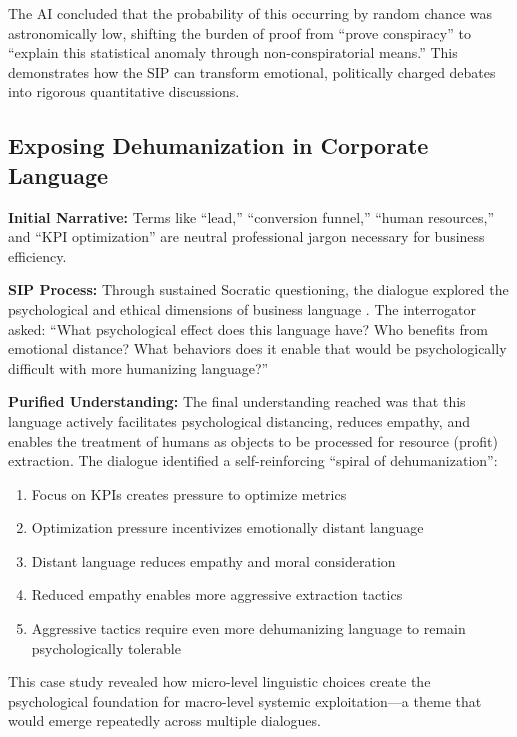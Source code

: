 \documentclass[11pt,a4paper]{article}
\begin{document}
The AI concluded that the probability of this occurring by random chance was astronomically low, shifting the burden of proof from ``prove conspiracy'' to ``explain this statistical anomaly through non-conspiratorial means.'' This demonstrates how the SIP can transform emotional, politically charged debates into rigorous quantitative discussions.

\subsection{Exposing Dehumanization in Corporate Language}

\textbf{Initial Narrative:} Terms like ``lead,'' ``conversion funnel,'' ``human resources,'' and ``KPI optimization'' are neutral professional jargon necessary for business efficiency.

\textbf{SIP Process:} Through sustained Socratic questioning, the dialogue explored the psychological and ethical dimensions of business language \citep{dialogue0}. The interrogator asked: ``What psychological effect does this language have? Who benefits from emotional distance? What behaviors does it enable that would be psychologically difficult with more humanizing language?''

\textbf{Purified Understanding:} The final understanding reached was that this language actively facilitates psychological distancing, reduces empathy, and enables the treatment of humans as objects to be processed for resource (profit) extraction. The dialogue identified a self-reinforcing ``spiral of dehumanization'':

\begin{enumerate}[nosep]
    \item Focus on KPIs creates pressure to optimize metrics
    \item Optimization pressure incentivizes emotionally distant language
    \item Distant language reduces empathy and moral consideration
    \item Reduced empathy enables more aggressive extraction tactics
    \item Aggressive tactics require even more dehumanizing language to remain psychologically tolerable
\end{enumerate}

This case study revealed how micro-level linguistic choices create the psychological foundation for macro-level systemic exploitation---a theme that would emerge repeatedly across multiple dialogues.
\end{document}
